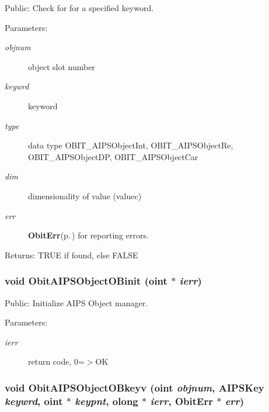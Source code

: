 Public: Check for for a specified keyword. 

\begin{Desc}
\item[Parameters:]
\begin{description}
\item[{\em objnum}]object slot number \item[{\em keywrd}]keyword \item[{\em type}]data type OBIT\_\-AIPSObject\-Int, OBIT\_\-AIPSObject\-Re, OBIT\_\-AIPSObject\-DP, OBIT\_\-AIPSObject\-Car \item[{\em dim}]dimensionality of value (valuec) \item[{\em err}]{\bf Obit\-Err}{\rm (p.\,\pageref{structObitErr})} for reporting errors. \end{description}
\end{Desc}
\begin{Desc}
\item[Returns:]TRUE if found, else FALSE \end{Desc}
\subsubsection{\setlength{\rightskip}{0pt plus 5cm}void Obit\-AIPSObject\-OBinit ({\bf oint} $\ast$ {\em ierr})}\label{ObitAIPSObject_8h_a10}


Public: Initialize AIPS Object manager. 

\begin{Desc}
\item[Parameters:]
\begin{description}
\item[{\em ierr}]return code, 0=$>$OK \end{description}
\end{Desc}
\subsubsection{\setlength{\rightskip}{0pt plus 5cm}void Obit\-AIPSObject\-OBkeyv ({\bf oint} {\em objnum}, {\bf AIPSKey} {\em keywrd}, {\bf oint} $\ast$ {\em keypnt}, {\bf olong} $\ast$ {\em ierr}, {\bf Obit\-Err} $\ast$ {\em err})}\label{ObitAIPSObject_8h_a12}


